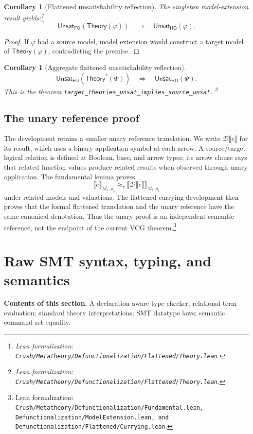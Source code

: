 \documentclass[11pt]{article}
\newtheorem{corollary}[definition]{Corollary}
\theoremstyle{remark}
\newcommand{\leanfile}[1]{\footnote{Lean formalization: \texttt{Crush/Metatheory/#1}.}}
\newcommand{\leanfiles}[1]{\footnote{Lean formalization: \texttt{Crush/Metatheory/#1}.}}
\newcommand{\sectioncontents}[1]{%
  \smallskip\noindent\textbf{Contents of this section.} #1\par\medskip}
\newcommand{\den}[3]{\llbracket #1\rrbracket_{#2,#3}}
\newcommand{\unary}[1]{\mathcal D\llbracket #1\rrbracket}
\newcommand{\unsat}{\mathsf{Unsat}}
\newcommand{\Theory}{\mathsf{Theory}}
\newcommand{\Theorys}[1]{\mathsf{Theory}^{\!*}(#1)}
\begin{document}
\begin{corollary}[Flattened unsatisfiability reflection]
The singleton model-extension result yields:\leanfile{Defunctionalization/Flattened/Theory.lean}
\[
 \unsat_{\mathsf{FO}}(\Theory(\varphi))
 \quad\Longrightarrow\quad
 \unsat_{\mathsf{HO}}(\varphi).
\]
\end{corollary}
\begin{proof}
If $\varphi$ had a source model, model extension would construct a target model
of $\Theory(\varphi)$, contradicting the premise.
\end{proof}

\begin{corollary}[Aggregate flattened unsatisfiability reflection]
\[
 \unsat_{\mathsf{FO}}(\Theorys{\Phi})
 \quad\Longrightarrow\quad
 \unsat_{\mathsf{HO}}(\Phi).
\]
This is the theorem \texttt{target\_theories\_unsat\_implies\_source\_unsat}.
\leanfile{Defunctionalization/Flattened/Theory.lean}
\end{corollary}

\subsection{The unary reference proof}

The development retains a smaller unary reference translation. We write $\unary{e}$
for its result, which uses a
binary application symbol at each arrow. A source/target logical relation is
defined at Boolean, base, and arrow types; its arrow clause says that related
function values produce related results when observed through unary
application. The fundamental lemma proves
\[
 \den{e}{M_s}{\rho_s}\approx_\tau
 \den{\unary{e}}{M_t}{\rho_t}
\]
under related models and valuations. The flattened currying development then
proves that the formal flattened translation and the unary reference have the
same canonical denotation. Thus the unary proof is an independent semantic
reference, not the endpoint of the current VCG
theorem.\leanfiles{Defunctionalization/Fundamental.lean, Defunctionalization/ModelExtension.lean, and Defunctionalization/Flattened/Currying.lean}

\section{Raw SMT syntax, typing, and semantics}
\sectioncontents{A declaration-aware type checker; relational term evaluation; standard theory interpretations; SMT datatype laws; semantic command-set equality.}
\end{document}
